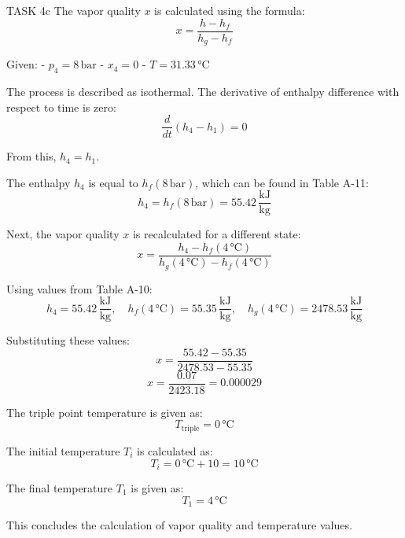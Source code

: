 TASK 4c  
The vapor quality \( x \) is calculated using the formula:  
\[
x = \frac{h - h_f}{h_g - h_f}
\]  

Given:  
- \( p_4 = 8 \, \text{bar} \)  
- \( x_4 = 0 \)  
- \( T = 31.33 \, \text{°C} \)  

The process is described as isothermal. The derivative of enthalpy difference with respect to time is zero:  
\[
\frac{d}{dt} (h_4 - h_1) = 0
\]  

From this, \( h_4 = h_1 \).  

The enthalpy \( h_4 \) is equal to \( h_f(8 \, \text{bar}) \), which can be found in Table A-11:  
\[
h_4 = h_f(8 \, \text{bar}) = 55.42 \, \frac{\text{kJ}}{\text{kg}}
\]  

Next, the vapor quality \( x \) is recalculated for a different state:  
\[
x = \frac{h_4 - h_f(4 \, \text{°C})}{h_g(4 \, \text{°C}) - h_f(4 \, \text{°C})}
\]  

Using values from Table A-10:  
\[
h_4 = 55.42 \, \frac{\text{kJ}}{\text{kg}}, \quad h_f(4 \, \text{°C}) = 55.35 \, \frac{\text{kJ}}{\text{kg}}, \quad h_g(4 \, \text{°C}) = 2478.53 \, \frac{\text{kJ}}{\text{kg}}
\]  

Substituting these values:  
\[
x = \frac{55.42 - 55.35}{2478.53 - 55.35}
\]  
\[
x = \frac{0.07}{2423.18} = 0.000029
\]  

The triple point temperature is given as:  
\[
T_{\text{triple}} = 0 \, \text{°C}
\]  

The initial temperature \( T_i \) is calculated as:  
\[
T_i = 0 \, \text{°C} + 10 = 10 \, \text{°C}
\]  

The final temperature \( T_1 \) is given as:  
\[
T_1 = 4 \, \text{°C}
\]  

This concludes the calculation of vapor quality and temperature values.